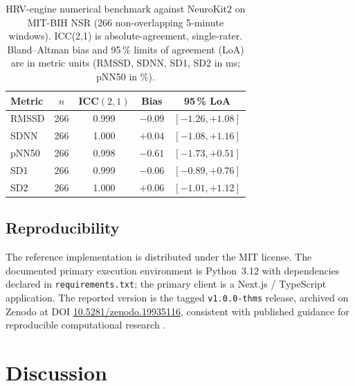 \documentclass[10pt,journal,twocolumn,compsoc]{IEEEtran}
\begin{document}
\begin{table}[t]
\caption{HRV-engine numerical benchmark against NeuroKit2 on MIT-BIH NSR (266 non-overlapping 5-minute windows). ICC(2,1) is absolute-agreement, single-rater. Bland--Altman bias and 95\,\% limits of agreement (LoA) are in metric units (RMSSD, SDNN, SD1, SD2 in ms; pNN50 in \%).}
\label{tab:benchmark}
\centering
\renewcommand{\arraystretch}{1.1}
\setlength{\tabcolsep}{6pt}
\begin{tabular}{@{}lcccc@{}}
\toprule
Metric & $n$ & ICC$(2,1)$ & Bias & 95\,\% LoA \\
\midrule
RMSSD  & 266 & 0.999 & $-0.09$ & $[-1.26,+1.08]$ \\
SDNN   & 266 & 1.000 & $+0.04$ & $[-1.08,+1.16]$ \\
pNN50  & 266 & 0.998 & $-0.61$ & $[-1.73,+0.51]$ \\
SD1    & 266 & 0.999 & $-0.06$ & $[-0.89,+0.76]$ \\
SD2    & 266 & 1.000 & $+0.06$ & $[-1.01,+1.12]$ \\
\bottomrule
\end{tabular}
\end{table}

\subsection{Reproducibility}
The reference implementation is distributed under the MIT license. The documented primary execution environment is Python~3.12 with dependencies declared in \texttt{requirements.txt}; the primary client is a Next.js / TypeScript application. The reported version is the tagged \texttt{v1.0.0-thms} release, archived on Zenodo at DOI \href{https://doi.org/10.5281/zenodo.19935116}{10.5281/zenodo.19935116}, consistent with published guidance for reproducible computational research \cite{sandve2013}.

\section{Discussion}
\end{document}
